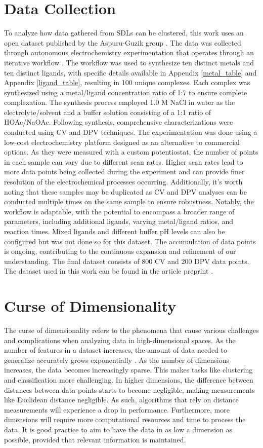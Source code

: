 \section{Data Collection}
To analyze how data gathered from SDLs can be clustered, this work uses an open dataset published by the Aspuru-Guzik group \cite{PabloGarca2024}. The data was collected through autonomous electrochemistry experimentation that operates through an iterative workflow \cite{PabloGarca2024}. The workflow was used to synthesize ten distinct metals and ten distinct ligands, with specific details available in Appendix \ref{metal_table} and Appendix \ref{ligand_table}, resulting in 100 unique complexes. Each complex was synthesized using a metal/ligand concentration ratio of 1:7 to ensure complete complexation. The synthesis process employed 1.0 M NaCl in water as the electrolyte/solvent and a buffer solution consisting of a 1:1 ratio of HOAc/NaOAc. Following synthesis, comprehensive characterizations were conducted using CV and DPV techniques. The experimentation was done using a low-cost electrochemistry platform designed as an alternative to commercial options. As they were measured with a custom potentiostat, the number of points in each sample can vary due to different scan rates. Higher scan rates lead to more data points being collected during the experiment and can provide finer resolution of the electrochemical processes occurring. Additionally, it's worth noting that these samples may be duplicated as CV and DPV analyses can be conducted multiple times on the same sample to ensure robustness. Notably, the workflow is adaptable, with the potential to encompass a broader range of parameters, including additional ligands, varying metal/ligand ratios, and reaction times. Mixed ligands and different buffer pH levels can also be configured but was not done so for this dataset. The accumulation of data points is ongoing, contributing to the continuous expansion and refinement of our understanding. The final dataset consists of 800 CV and 200 DPV data points. The dataset used in this work can be found in the article preprint \cite{PabloGarca2024}.
\section{Curse of Dimensionality}
The curse of dimensionality refers to the phenomena that cause various challenges and complications when analyzing data in high-dimensional spaces. As the number of features in a dataset increases, the amount of data needed to generalize accurately grows exponentially \cite{Bellman2003-by}. As the number of dimensions increases, the data becomes increasingly sparse. This makes tasks like clustering and classification more challenging. In higher dimensions, the difference between distances between data points starts to become negligible, making measurements like Euclidean distance negligible. As such, algorithms that rely on distance measurements will experience a drop in performance. Furthermore, more dimensions will require more computational resources and time to process the data. It is good practice to aim to have the data in as low a dimension as possible, provided that relevant information is maintained. 
